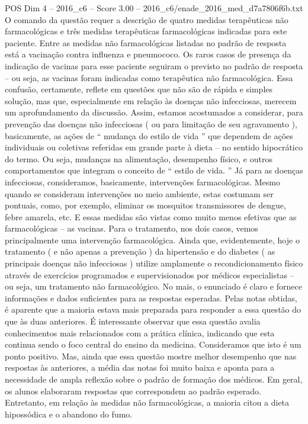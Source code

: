 \begin{textsample}{POS Dim 4 – 2016\_c6 – Score 3.00 – 2016\_c6/enade\_2016\_med\_d7a7806f6b.txt}
O comando da questão requer a descrição de quatro medidas terapêuticas não farmacológicas e três medidas terapêuticas farmacológicas indicadas para este paciente.
Entre as medidas não farmacológicas listadas no padrão de resposta está a vacinação contra influenza e pneumococo.
Os raros casos de presença da indicação de vacinas para esse paciente seguiram o previsto no padrão de resposta – ou seja, as vacinas foram indicadas como terapêutica não farmacológica.
Essa confusão, certamente, reflete em questões que não são de rápida e simples solução, mas que, especialmente em relação às doenças não infecciosas, merecem um aprofundamento da discussão.
Assim, estamos acostumados a considerar, para prevenção das doenças não infecciosas ( ou para limitação de seu agravamento ), basicamente, as ações de “ mudança do estilo de vida ” que dependem de ações individuais ou coletivas referidas em grande parte à dieta – no sentido hipocrático do termo.
Ou seja, mudanças na alimentação, desempenho físico, e outros comportamentos que integram o conceito de “ estilo de vida. ” Já para as doenças infecciosas, consideramos, basicamente, intervenções farmacológicas.
Mesmo quando se consideram intervenções no meio ambiente, estas costumam ser pontuais, como, por exemplo, eliminar os mosquitos transmissores de dengue, febre amarela, etc.
E essas medidas são vistas como muito menos efetivas que as farmacológicas – as vacinas.
Para o tratamento, nos dois casos, vemos principalmente uma intervenção farmacológica.
Ainda que, evidentemente, hoje o tratamento ( e não apenas a prevenção ) da hipertensão e do diabetes ( as principais doenças não infecciosas ) utilize amplamente o recondicionamento físico através de exercícios programados e supervisionados por médicos especialistas – ou seja, um tratamento não farmacológico.
No mais, o enunciado é claro e fornece informações e dados suficientes para as respostas esperadas.
Pelas notas obtidas, é aparente que a maioria estava mais preparada para responder a essa questão do que às duas anteriores.
É interessante observar que essa questão avalia conhecimentos mais relacionados com a prática clínica, indicando que esta continua sendo o foco central do ensino da medicina.
Consideramos que isto é um ponto positivo.
Mas, ainda que essa questão mostre melhor desempenho que nas respostas às anteriores, a média das notas foi muito baixa e aponta para a necessidade de ampla reflexão sobre o padrão de formação dos médicos.
Em geral, os alunos elaboraram respostas que correspondem ao padrão esperado.
Entretanto, em relação às medidas não farmacológicas, a maioria citou a dieta hipossódica e o abandono do fumo.

\end{textsample}
